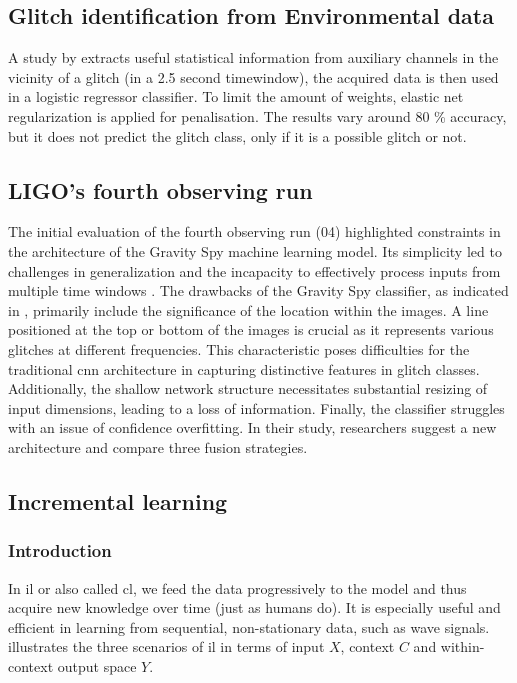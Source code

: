 \subsection{Glitch identification from Environmental data}
A study by \citep{colgan2020efficient} extracts useful statistical information from auxiliary channels in the vicinity of a glitch (in a 2.5 second timewindow), the acquired data is then used in a logistic regressor classifier. To limit the amount of weights, elastic net regularization \citep{zou2005regularization} is applied for penalisation. 
The results vary around 80 \% accuracy, but it does not predict the glitch class, only if it is a possible glitch or not. 

\subsection{LIGO's fourth observing run}
The initial evaluation of the fourth observing run (04) highlighted constraints in the architecture of the Gravity Spy machine learning model. Its simplicity led to challenges in generalization and the incapacity to effectively process inputs from multiple time windows \citep{wu2024advancing}. The drawbacks of the Gravity Spy classifier, as indicated in \citep{jarov2023new, alvarez2023gspynettree}, primarily include the significance of the location within the images. A line positioned at the top or bottom of the images is crucial as it represents various glitches at different frequencies. This characteristic poses difficulties for the traditional \acrshort{cnn} architecture in capturing distinctive features in glitch classes. Additionally, the shallow network structure necessitates substantial resizing of input dimensions, leading to a loss of information. Finally, the classifier struggles with an issue of confidence overfitting. In their study, researchers \citep{wu2024advancing} suggest a new architecture and compare three fusion strategies.
\newpage
\subsection{Incremental learning}
\label{ref:sub_incremental}
\subsubsection{Introduction}
In \acrshort{il} or also called \acrshort{cl}, we feed the data progressively to the model and thus acquire new knowledge over time (just as humans do). It is especially useful and efficient in learning from sequential, non-stationary data, such as wave signals. 
\citep{van2022three} illustrates the three scenarios of \acrshort{il} in terms of input $X$, context $C$ and within-context output space $Y$. 

